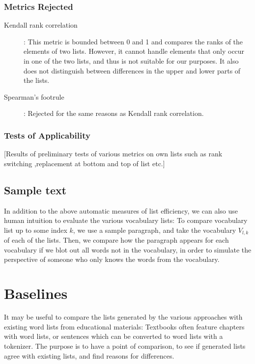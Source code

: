 \subsubsection{Metrics Rejected}
\begin{description}
	\item [Kendall rank correlation ] \cite{kendallNEWMEASURERANK1938b}: This metric is bounded between 0 and 1 and compares the ranks of the elements of two lists. However, it cannot handle elements that only occur in one of the two lists, and thus is not suitable for our purposes. It also does not distinguish between differences in the upper and lower parts of the lists.
	\item [Spearman's footrule] \cite{spearmanCorrelationCalculatedFaulty1910}: Rejected for the same reasons as Kendall rank correlation.
\end{description}


\subsubsection{Tests of Applicability}
[Results of preliminary tests of various metrics on own lists such as rank switching ,replacement at bottom and top of list etc.]

\subsection{Sample text}
In addition to the above automatic measures of list efficiency, we can also use human intuition to evaluate the various vocabulary lists:
To compare vocabulary list up to some index $k$, we use a sample paragraph, and take the vocabulary $V_{l, k}$ of each of the lists.
Then, we compare how the paragraph appears for each vocabulary if we blot out all words not in the vocabulary, in order to simulate the perspective of someone who only knows the words from the vocabulary.







\section{Baselines}
It may be useful to compare the lists generated by the various approaches with existing word lists from educational materials:
Textbooks often feature chapters with word lists, or sentences which can be converted to word lists with a tokenizer.
The purpose is to have a point of comparison, to see if generated lists agree with existing lists, and find reasons for differences.

